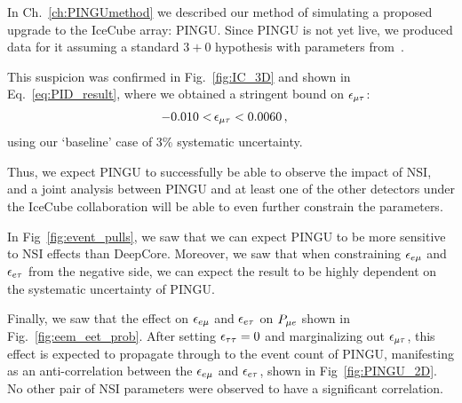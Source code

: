 In Ch.~\ref{ch:PINGUmethod} we described our method of simulating a proposed upgrade to the IceCube array: PINGU.
Since PINGU is not yet live, we produced data for it assuming a standard $3+0$ hypothesis with parameters from~\cite{nufit}.

This suspicion was confirmed in Fig.~\ref{fig:IC_3D} and shown in Eq.~\ref{eq:PID_result}, where we obtained a stringent bound on $\epsilon_{\mu\tau}$:
\begin{align}
    -0.010 <&\, \epsilon_{\mu\tau} < 0.0060\,,
 \end{align}
using our `baseline' case of 3\% systematic uncertainty.



Thus, we expect PINGU to successfully be able to observe the impact of NSI, and a joint analysis between PINGU and at least one of the other detectors under the IceCube collaboration
will be able to even further constrain the parameters.


In Fig~\ref{fig:event_pulls}, we saw that we can expect PINGU to be more sensitive to NSI effects than DeepCore. Moreover, we saw that when constraining $\epsilon_{e\mu}$ and $\epsilon_{e\tau}$ from the negative side, 
we can expect the result to be highly dependent on the systematic uncertainty of PINGU.

Finally, we saw that the effect on $\epsilon_{e\mu}$ and $\epsilon_{e\tau}$ on $P_{\mu e}$ shown in Fig.~\ref{fig:eem_eet_prob}.
After setting $\epsilon_{\tau\tau}=0$ and marginalizing out $\epsilon_{\mu\tau}$, this effect is expected to propagate through to the event count of PINGU, 
manifesting as an anti-correlation between the $\epsilon_{e\mu}$ and $\epsilon_{e\tau}$, shown in Fig~\ref{fig:PINGU_2D}. No other pair of NSI parameters were observed to have 
a significant correlation.
